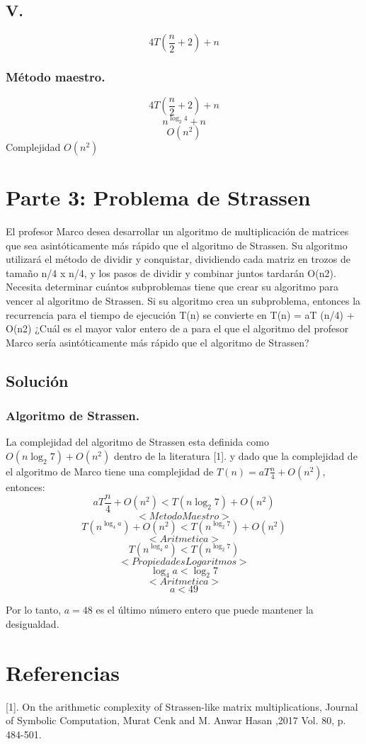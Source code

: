 \documentclass[12pt]{exam}
\begin{document}
\subsection*{V.}
$$ 4T(\frac{n}{2}+2) + n $$



\subsubsection*{Método maestro.}
$$ 4T(\frac{n}{2}+2) + n $$
$$ n^{\log_{2}4} + n$$
$$ O(n^{2}) $$
Complejidad $O(n^2)$

\section*{Parte 3: Problema de Strassen}

El profesor Marco desea desarrollar un algoritmo de multiplicación de matrices
que sea asintóticamente más rápido que el algoritmo de Strassen. Su algoritmo utilizará el
método de dividir y conquistar, dividiendo cada matriz en trozos de tamaño n/4 x n/4, y los
pasos de dividir y combinar juntos tardarán O(n2). Necesita determinar cuántos subproblemas
tiene que crear su algoritmo para vencer al algoritmo de Strassen. Si su algoritmo crea
un subproblema, entonces la recurrencia para el tiempo de ejecución T(n) se convierte en
T(n) = aT (n/4) + O(n2) ¿Cuál es el mayor valor entero de a para el que el algoritmo del
profesor Marco sería asintóticamente más rápido que el algoritmo de Strassen?

\subsection*{Solución}
\subsubsection*{Algoritmo de Strassen.}
La complejidad del algoritmo de Strassen esta definida como $ O(n\log_{2}7)+O(n^2) $ dentro de la
literatura [1]. y dado que la complejidad de el algoritmo de Marco tiene una complejidad
de $ T(n) = aT \frac{n}{4} + O(n^2) $, entonces:
$$ aT \frac{n}{4} + O(n^2) < T(n\log_{2}7) + O(n^2)$$
$$ <Metodo Maestro> $$
$$ T(n^{\log_{4}a}) + O(n^2) < T(n^{\log_{2}7}) + O(n^2)$$
$$ <Aritmetica> $$
$$ T(n^{\log_{4}a}) < T(n^{\log_{2}7})$$
$$ <Propiedades Logaritmos> $$
$$ \log_{4}a < \log_{2}7$$
$$ <Aritmetica> $$
$$ a < 49$$

Por lo tanto, $a = 48$ es el último número entero que puede mantener la desigualdad.



\section*{Referencias}
[1]. On the arithmetic complexity of Strassen-like matrix multiplications, 
Journal of Symbolic Computation, Murat Cenk and M. Anwar Hasan ,2017
Vol. 80, p. 484-501. 
\end{document}
